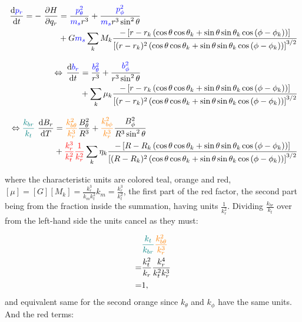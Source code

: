 \begin{align}
    \begin{split}
        \operatorname{}\frac{\mathrm{d} \textcolor{blue}{p_r}}{\mathrm{d} t} = -\operatorname{}\frac{\partial H}{\partial q_r} &= \frac{\textcolor{blue}{p_\theta^2}}{\textcolor{blue}{m_s} r^3} + \frac{\textcolor{blue}{p_\phi^2}}{\textcolor{blue}{m_s} r^3 \sin^2{\theta} } \\
        &+ G \textcolor{blue}{m_s} \sum\limits_{k} M_k \frac{-\left[r - r_k \left(\cos{\theta}\cos{\theta_k} + \sin{\theta}\sin{\theta_k}\cos{(\phi - \phi_k)}\right) \right]}{\left[(r - r_k)^2 \left(\cos{\theta}\cos{\theta_k} + \sin{\theta}\sin{\theta_k}\cos{(\phi - \phi_k)} \right) \right]^{3/2}}
    \end{split} \\[0.3cm]
    \begin{split}
        \Leftrightarrow \operatorname{}\frac{\mathrm{d} \textcolor{blue}{b_r}}{\mathrm{d} t} &= \frac{\textcolor{blue}{b_\theta^2}}{r^3} + \frac{\textcolor{blue}{b_\phi^2}}{r^3 \sin^2{\theta} } \\
        &+ \sum\limits_{k} \mu_k \frac{-\left[r - r_k \left(\cos{\theta}\cos{\theta_k} + \sin{\theta}\sin{\theta_k}\cos{(\phi - \phi_k)}\right) \right]}{\left[(r - r_k)^2 \left(\cos{\theta}\cos{\theta_k} + \sin{\theta}\sin{\theta_k}\cos{(\phi - \phi_k)} \right) \right]^{3/2}}
    \end{split} \\[0.3cm]
    \begin{split}
        \Leftrightarrow \textcolor{teal}{\frac{k_{br}}{k_t}} \operatorname{}\frac{\mathrm{d} B_r}{\mathrm{d} T} &= \textcolor{orange}{\frac{k_{b\theta}^2}{k_r^3}} \frac{B_\theta^2}{R^3} + \textcolor{orange}{\frac{k_{b\phi}^2}{k_r^3}} \frac{B_\phi^2}{R^3 \sin^2{\theta} } \\
        &+ \textcolor{red}{\frac{k_r^3}{k_t^2}\frac{1}{k_r^2}} \sum\limits_{k} \eta_k \frac{-\left[R - R_k \left(\cos{\theta}\cos{\theta_k} + \sin{\theta}\sin{\theta_k}\cos{(\phi - \phi_k)}\right) \right]}{\left[(R - R_k)^2 \left(\cos{\theta}\cos{\theta_k} + \sin{\theta}\sin{\theta_k}\cos{(\phi - \phi_k)} \right) \right]^{3/2}}
    \end{split}
\end{align}

where the characteristic units are colored teal, orange and red, \([\mu] = [G] [M_k] = \frac{k_r^3}{k_m k_t^2} k_m = \frac{k_r^3}{k_t^2} \), the first part of the red factor, the second part being from the fraction inside the summation, having units \(\frac{1}{k_r^2}\). Dividing \(\frac{k_{br}}{k_t}\) over from the left-hand side the units cancel as they must:

\begin{align}
    & \textcolor{teal}{\frac{k_t}{k_{br}}} \textcolor{orange}{\frac{k_{b\theta}^2}{k_r^3} } \\
    = &\frac{k_t^2}{k_r} \frac{k_r^4}{k_t^2 k_r^3}\\
    = &1,
\end{align}
and equivalent same for the second orange since \(k_\theta\) and \(k_\phi\) have the same units. And the red terms:

